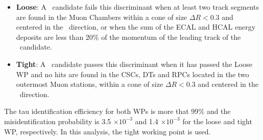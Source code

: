 \begin{itemize}
 \item \textbf{Loose}: A \tauh~candidate fails this discriminant when at least two track segments are found 
 in the Muon Chambers within a cone of size $\Delta R < 0.3$ and centered in the \tauh~direction, or when 
 the sum of the ECAL and HCAL energy deposits are less than 20$\%$ of the momentum of the leading track
 of the \tauh~candidate.
 \item \textbf{Tight}: A \tauh~candidate passes this discriminant when it has passed the Loose WP and no hits are found in 
 the CSCs, DTs and RPCs located in the two outermost Muon stations, within a cone of size $\Delta R < 0.3$ and 
 centered in the \tauh~direction.
\end{itemize}

\noindent The tau identification efficiency for both WPs is more that 99$\%$ and
the misidentification probability is 3.5 $\times 10^{-3}$ and 1.4 $\times 10^{-3}$
for the loose and tight WP, respectively. In this analysis, the tight working point is used.


